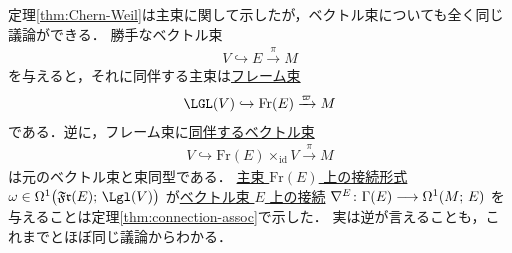 \documentclass[TQFT_main]{subfiles}
\begin{document}
定理\ref{thm:Chern-Weil}は主束に関して示したが，ベクトル束についても全く同じ議論ができる．
勝手なベクトル束
\begin{align}
    V \hookrightarrow E \xrightarrow{\pi} M
\end{align}
を与えると，それに同伴する主束は\hyperref[def:framebundle]{フレーム束}
\begin{align}
    \LGL(V) \hookrightarrow \mathrm{Fr}(E) \xrightarrow{\varpi} M
\end{align}
である．逆に，フレーム束に\hyperref[prop:Borelconst]{同伴するベクトル束}
\begin{align}
    V \hookrightarrow \mathrm{Fr}(E) \times_{\mathrm{id}} V \xrightarrow{\pi} M
\end{align}
は元のベクトル束と束同型である．
\hyperref[def:connection]{主束 $\mathrm{Fr}(E)$ 上の接続形式} $\omega \in \Omega^1\bigl(\mathfrak{Fr}(E);\, \mathfrak{\Lgl}(V)\bigr)$ が\hyperref[def:connection-vect]{ベクトル束 $E$ 上の接続} $\nabla^E \colon \Gamma(E) \longrightarrow \Omega^1(M;\, E)$ を与えることは定理\ref{thm:connection-assoc}で示した．
実は逆が言えることも，これまでとほぼ同じ議論からわかる．
\end{document}
